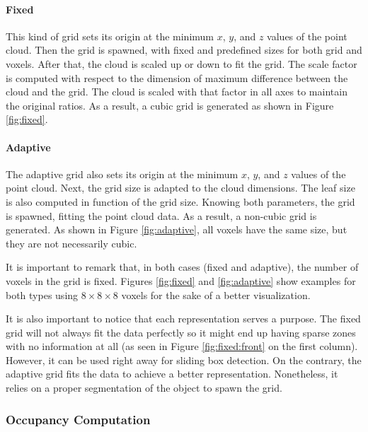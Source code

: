 \paragraph{Fixed}

This kind of grid sets its origin at the minimum $x$, $y$, and $z$ values of the point cloud. Then the grid is spawned, with fixed and predefined sizes for both grid and voxels. After that, the cloud is scaled up or down to fit the grid. The scale factor is computed with respect to the dimension of maximum difference between the cloud and the grid. The cloud is scaled with that factor in all axes to maintain the original ratios. As a result, a cubic grid is generated as shown in Figure \ref{fig:fixed}.

\paragraph{Adaptive}

The adaptive grid also sets its origin at the minimum $x$, $y$, and $z$ values of the point cloud. Next, the grid size is adapted to the cloud dimensions. The leaf size is also computed in function of the grid size. Knowing both parameters, the grid is spawned, fitting the point cloud data. As a result, a non-cubic grid is generated. As shown in Figure \ref{fig:adaptive}, all voxels have the same size, but they are not necessarily cubic.

It is important to remark that, in both cases (fixed and adaptive), the number of voxels in the grid is fixed. Figures \ref{fig:fixed} and \ref{fig:adaptive} show examples for both types using $8\times8\times8$ voxels for the sake of a better visualization.

It is also important to notice that each representation serves a purpose. The fixed grid will not always fit the data perfectly so it might end up having sparse zones with no information at all (as seen in Figure \ref{fig:fixed:front} on the first column). However, it can be used right away for sliding box detection. On the contrary, the adaptive grid fits the data to achieve a better representation. Nonetheless, it relies on a proper segmentation of the object to spawn the grid.

\subsubsection{Occupancy Computation}
\label{cha:objrecog:sec:study:subsec:representation:subsubsec:occupancy}

